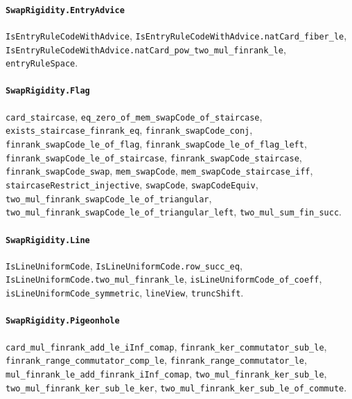 \paragraph{\texttt{SwapRigidity.EntryAdvice}}
{\small\raggedright \texttt{IsEntryRuleCodeWithAdvice}, \texttt{IsEntryRuleCodeWithAdvice.natCard\_fiber\_le}, \texttt{IsEntryRuleCodeWithAdvice.natCard\_pow\_two\_mul\_finrank\_le}, \texttt{entryRuleSpace}.\par}

\paragraph{\texttt{SwapRigidity.Flag}}
{\small\raggedright \texttt{card\_staircase}, \texttt{eq\_zero\_of\_mem\_swapCode\_of\_staircase}, \texttt{exists\_staircase\_finrank\_eq}, \texttt{finrank\_swapCode\_conj}, \texttt{finrank\_swapCode\_le\_of\_flag}, \texttt{finrank\_swapCode\_le\_of\_flag\_left}, \texttt{finrank\_swapCode\_le\_of\_staircase}, \texttt{finrank\_swapCode\_staircase}, \texttt{finrank\_swapCode\_swap}, \texttt{mem\_swapCode}, \texttt{mem\_swapCode\_staircase\_iff}, \texttt{staircaseRestrict\_injective}, \texttt{swapCode}, \texttt{swapCodeEquiv}, \texttt{two\_mul\_finrank\_swapCode\_le\_of\_triangular}, \texttt{two\_mul\_finrank\_swapCode\_le\_of\_triangular\_left}, \texttt{two\_mul\_sum\_fin\_succ}.\par}

\paragraph{\texttt{SwapRigidity.Line}}
{\small\raggedright \texttt{IsLineUniformCode}, \texttt{IsLineUniformCode.row\_succ\_eq}, \texttt{IsLineUniformCode.two\_mul\_finrank\_le}, \texttt{isLineUniformCode\_of\_coeff}, \texttt{isLineUniformCode\_symmetric}, \texttt{lineView}, \texttt{truncShift}.\par}

\paragraph{\texttt{SwapRigidity.Pigeonhole}}
{\small\raggedright \texttt{card\_mul\_finrank\_add\_le\_iInf\_comap}, \texttt{finrank\_ker\_commutator\_sub\_le}, \texttt{finrank\_range\_commutator\_comp\_le}, \texttt{finrank\_range\_commutator\_le}, \texttt{mul\_finrank\_le\_add\_finrank\_iInf\_comap}, \texttt{two\_mul\_finrank\_ker\_sub\_le}, \texttt{two\_mul\_finrank\_ker\_sub\_le\_ker}, \texttt{two\_mul\_finrank\_ker\_sub\_le\_of\_commute}.\par}

